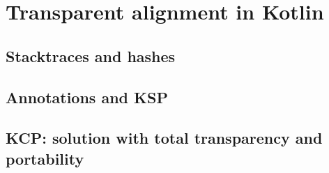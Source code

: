 \chapter{Transparent alignment in Kotlin}\label{chapter:alignment}

\section{Stacktraces and hashes}
\section{Annotations and KSP}
\section{KCP: solution with total transparency and portability}